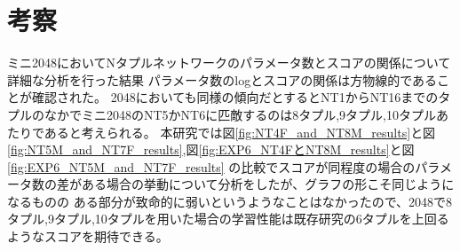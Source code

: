 \section{考察}
\label{sec:consideration}
ミニ2048においてNタプルネットワークのパラメータ数とスコアの関係について詳細な分析を行った結果
パラメータ数のlogとスコアの関係は方物線的であることが確認された。
2048においても同様の傾向だとするとNT1からNT16までのタプルのなかでミニ2048のNT5かNT6に匹敵するのは8タプル,9タプル,10タプルあたりであると考えられる。
本研究では図\ref{fig:NT4F_and_NT8M_results}と図\ref{fig:NT5M_and_NT7F_results},図\ref{fig:EXP6_NT4FとNT8M_results}と図\ref{fig:EXP6_NT5M_and_NT7F_results}
の比較でスコアが同程度の場合のパラメータ数の差がある場合の挙動について分析をしたが、グラフの形こそ同じようになるものの
ある部分が致命的に弱いというようなことはなかったので、2048で8タプル,9タプル,10タプルを用いた場合の学習性能は既存研究の6タプルを上回るようなスコアを期待できる。

